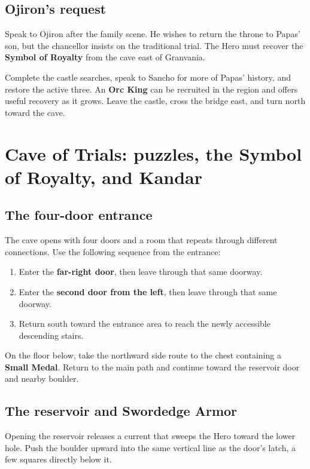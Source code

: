 \subsection*{Ojiron's request}

Speak to Ojiron after the family scene. He wishes to return the
throne to Papas' son, but the chancellor insists on the traditional
trial. The Hero must recover the \textbf{Symbol of Royalty} from
the cave east of Granvania.

Complete the castle searches, speak to Sancho for more of Papas'
history, and restore the active three. An \textbf{Orc King} can
be recruited in the region and offers useful recovery as it grows.
Leave the castle, cross the bridge east, and turn north toward the cave.

\section{Cave of Trials: puzzles, the Symbol of Royalty, and Kandar}

\subsection*{The four-door entrance}

The cave opens with four doors and a room that repeats through
different connections. Use the following sequence from the entrance:
\begin{enumerate}
  \item Enter the \textbf{far-right door}, then leave through that
    same doorway.
  \item Enter the \textbf{second door from the left}, then leave
    through that same doorway.
  \item Return south toward the entrance area to reach the newly
    accessible descending stairs.
\end{enumerate}

On the floor below, take the northward side route to the chest
containing a \textbf{Small Medal}. Return to the main path and
continue toward the reservoir door and nearby boulder.

\subsection*{The reservoir and Swordedge Armor}

Opening the reservoir releases a current that sweeps the Hero
toward the lower hole. Push the boulder upward into the same vertical
line as the door's latch, a few squares directly below it.

